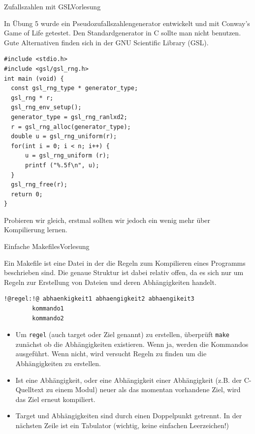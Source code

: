 \documentclass[xcolor=dvipsnames]{beamer}
\newcounter{lecturecounter}
\begin{document}
\begin{frame}[fragile]{Zufallszahlen mit GSL}{Vorlesung }
\begin{block}{}
  In Übung 5 wurde ein Pseudozufallszahlengenerator entwickelt und mit Conway's Game of Life getestet. Den Standardgenerator in C sollte man nicht benutzen. Gute Alternativen finden sich in der GNU Scientific Library (GSL).
\end{block}
\begin{lstlisting}[basicstyle=\ttfamily\scriptsize]
#include <stdio.h>
#include <gsl/gsl_rng.h>
int main (void) {
  const gsl_rng_type * generator_type;
  gsl_rng * r;
  gsl_rng_env_setup();
  generator_type = gsl_rng_ranlxd2;
  r = gsl_rng_alloc(generator_type);
  double u = gsl_rng_uniform(r);
  for(int i = 0; i < n; i++) {
      u = gsl_rng_uniform (r);
      printf ("%.5f\n", u);
  }
  gsl_rng_free(r);
  return 0;
}
\end{lstlisting}
Probieren wir gleich, erstmal sollten wir jedoch ein wenig mehr über Kompilierung lernen.
\end{frame}

\begin{frame}[fragile]{Einfache Makefiles}{Vorlesung }
\begin{block}{}
Ein Makefile ist eine Datei in der die Regeln zum Kompilieren eines Programms beschrieben sind. Die genaue Struktur ist dabei relativ offen, da es sich nur um Regeln zur Erstellung von Dateien und deren Abhängigkeiten handelt.
\end{block}
\begin{lstlisting}[basicstyle=\ttfamily\scriptsize]
!@regel:!@ abhaenkigkeit1 abhaengigkeit2 abhaengikeit3
        kommando1
        kommando2
\end{lstlisting}
\begin{itemize}
  \item{Um \verb|regel| (auch target oder Ziel genannt) zu erstellen, überprüft \verb|make| zunächst ob die Abhängigkeiten existieren. Wenn ja, werden die Kommandos ausgeführt. Wenn nicht, wird versucht Regeln zu finden um die Abhängigkeiten zu erstellen.}
  \item{Ist eine Abhängigkeit, oder eine Abhängigkeit einer Abhängigkeit (z.B. der C-Quelltext zu einem Modul) neuer als das momentan vorhandene Ziel, wird das Ziel erneut kompiliert.}
  \item{Target und Abhängigkeiten sind durch einen Doppelpunkt getrennt. In der nächsten Zeile ist ein Tabulator (wichtig, keine einfachen Leerzeichen!)}
\end{itemize}
\end{frame}
\end{document}
